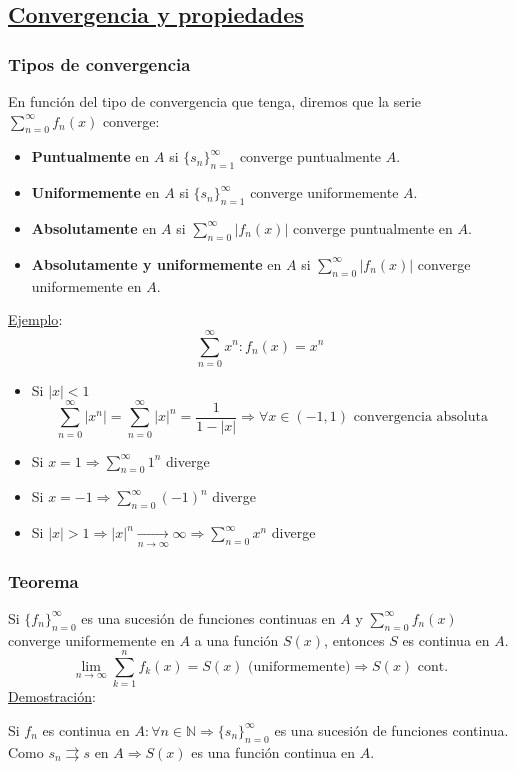 \documentclass[10pt,a4paper,openright]{book}
\begin{document}
\subsection*{\underline{Convergencia y propiedades}}
\subsubsection*{Tipos de convergencia}
En función del tipo de convergencia que tenga, diremos que la serie $\displaystyle \sum_{n=0}^{\infty} f_n (x)$ converge:
\begin{itemize}
\item \textbf{Puntualmente} en $A$ si $\{s_n\}_{n = 1}^\infty$ converge puntualmente  $A$.
\item \textbf{Uniformemente} en $A$ si $\{s_n\}_{n = 1}^\infty$ converge uniformemente $A$.
\item \textbf{Absolutamente} en $A$ si $\sum_{n=0}^{\infty} |f_n (x)|$ converge puntualmente en $A$.
\item \textbf{Absolutamente y uniformemente} en $A$ si $\sum_{n=0}^{\infty} |f_n (x)|$ converge uniformemente en $A$.
\end{itemize}
\underline{Ejemplo}:
$$\sum_{n=0}^{\infty} x^n : f_n(x) = x^n$$
\begin{itemize}
\item Si $|x| < 1$
$$\sum_{n=0}^{\infty} |x^n| = \sum_{n=0}^{\infty} |x|^n = \frac{1}{1 - |x|} \Rightarrow \forall x \in (-1,1) \mbox{ convergencia absoluta}$$
\item Si $x = 1 \Rightarrow \sum_{n=0}^{\infty} 1^n $ diverge
\item Si $x = -1 \Rightarrow \sum_{n=0}^{\infty} (-1)^n $ diverge
\item Si $|x| > 1 \Rightarrow |x|^n \underset{n \to \infty}{\longrightarrow} \infty \Rightarrow \sum_{n=0}^{\infty} x^n$ diverge
\end{itemize}

\subsubsection*{Teorema}
Si $\{f_n\}_{n = 0}^\infty$ es una sucesión de funciones continuas en $A$ y $\sum_{n=0}^{\infty} f_n (x)$ converge uniformemente en $A$ a una función $S(x)$, entonces $S$ es continua en $A$.
$$\lim_{n \to \infty} \sum_{k=1}^{n} f_k (x) = S(x) \mbox{ (uniformemente)} \Rightarrow S(x) \mbox{ cont.}$$
\underline{Demostración}:

Si $f_n$ es continua en $A : \forall n \in \mathbb N\Rightarrow \{s_n\}_{n = 0}^\infty$ es una sucesión de funciones continua. Como $s_n \rightrightarrows s$ en $A \Rightarrow S(x)$ es una función continua en $A$.
\end{document}
